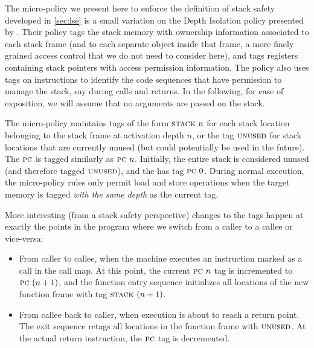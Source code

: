 \documentclass[acmsmall,review,anonymous]{acmart}\settopmatter{printfolios=true,printccs=false,printacmref=false}
\begin{document}

The micro-policy we present here to enforce the definition of stack
safety developed in \cref{sec:lse} is a small variation
on the Depth Isolation policy presented by
\citet{DBLP:conf/sp/RoesslerD18}. Their policy tags the stack memory
with ownership information associated to each stack frame (and to each
separate object inside that frame, a more finely grained access
control that we do not need to consider here), and tags registers containing
stack pointers with access permission information. The policy also
uses tags on instructions to identify the code
sequences that have permission to manage the stack, say during calls and returns.
In the following, for ease of exposition, we will assume that no
arguments are passed on the stack.

The micro-policy maintains tags of the form $\textsc{stack} ~ n$ for
each stack location belonging to the stack frame at activation depth
$n$, or the tag $\textsc{unused}$ for stack locations that are currently
unused (but could potentially be used in the future).
%
The $\textsc{pc}$ is tagged similarly as $\textsc{pc} ~ n$.
%
Initially, the entire stack is considered unused (and therefore tagged
$\textsc{unused}$), and the {\PCname} has tag $\textsc{pc} ~ 0$.
%
During normal execution, the micro-policy rules only permit load and
store operations when the target memory is tagged {\em with the same
  depth} as the current {\PCname} tag.


More interesting (from a stack safety perspective) changes to the tags
happen at exactly the points in the program where we switch from a
caller to a callee or vice-versa:

\begin{itemize}

\item From caller to callee, when the machine executes an instruction marked as a call in
  the call map.
  At this point, the current
  $\textsc{pc} ~ n$ tag is incremented to $\textsc{pc} ~ (n + 1)$, and the function
  entry sequence initializes  all locations of the new function frame with
  tag $\textsc{stack} ~ (n + 1)$.

\item From callee back to caller, when execution is about to reach a
  return point.  The exit sequence retags all locations in the
  function frame with $\textsc{unused}$. At the actual return instruction,
  the $\textsc{pc}$ tag is decremented. 

\end{itemize}
\end{document}
